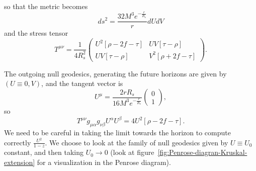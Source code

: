so that the metric becomes
\[
    ds^2 = \frac{32M^3e^{-\frac{r}{R_s}}}{r}dUdV
\]
and the stress tensor
\[
    T^{\mu\nu} = \frac{1}{4R_s^2}
    \begin{pmatrix}
        U^2 \left[\rho - 2f - \tau \right] &
        UV\left[\tau - \rho\right] \\ 
        UV\left[\tau - \rho\right] &
        V^2 \left[\rho + 2f - \tau \right]
    \end{pmatrix}.
\]


The outgoing null geodesics, generating the future horizons are given by \((U \equiv 0, V)\), and the tangent vector is 
\[
U^{\mu} = \frac{2rR_s}{16M^3e^{-\frac{r}{R_s}}} \begin{pmatrix}
    0 \\ 1
\end{pmatrix},
\]
so
\[
   T^{\mu\nu}g_{\mu\alpha}g_{\nu\beta}U^{\alpha}U^{\beta}  = 
    4U^2\left[\rho - 2f - \tau \right].
\]
We need to be careful in taking the limit towards the horizon to compute correctly \(\frac{U^2}{1 - z}\). We choose to look at the family of null geodesics given by \(U \equiv U_0\) constant, and then taking \(U_0 \rightarrow 0\) (look at figure~\ref{fig:Penrose-diagran-Kruskal-extension} for a visualization in the Penrose diagram). 

